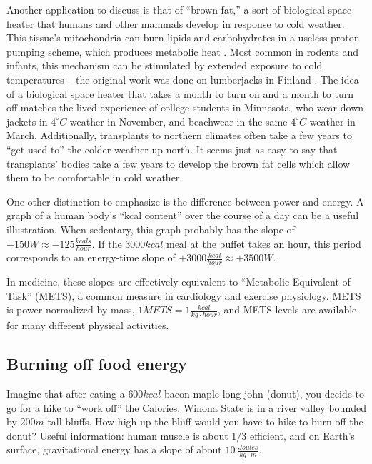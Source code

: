 \documentclass[prb,preprint]{revtex4-2}
\newcommand{\degC}{^{\circ}C}
\begin{document}
Another application to discuss is that of ``brown fat,'' a sort of biological space heater that humans and other mammals develop in response to cold weather.  This tissue's mitochondria can burn lipids and carbohydrates in a useless proton pumping scheme, which produces metabolic heat \cite{brown_fat_1,brown_fat_2,brown_fat_3,brown_fat_4}.  Most common in rodents and infants, this mechanism can be stimulated by extended exposure to cold temperatures -- the original work was done on lumberjacks in Finland \cite{finland_lumberjacks} .  The idea of a biological space heater that takes a month to turn on and a month to turn off matches the lived experience of college students in Minnesota, who wear down jackets in $4\degC$ weather in November, and beachwear in the same $4\degC$ weather in March.  Additionally, transplants to northern climates often take a few years to ``get used to'' the colder weather up north. It seems just as easy to say that transplants' bodies take a few years to develop the brown fat cells which allow them to be comfortable in cold weather.

One other distinction to emphasize is the difference between power and energy.  A graph of a human body's ``kcal content'' over the course of a day can be a useful illustration.  When sedentary, this graph probably has the slope of $-150W\approx -125 \frac{kcals}{hour}$.  If the $3000kcal$ meal at the buffet takes an hour, this period corresponds to an energy-time slope of 
$+3000\frac{kcal}{hour}\approx +3500W$.  

In medicine, these slopes are effectively equivalent to ``Metabolic Equivalent of Task'' (METS), a common measure in cardiology and exercise physiology.  METS is power normalized by mass, $1METS=1\frac{kcal}{kg\cdot hour}$, and METS levels are available for many different physical activities. \cite{METS}

\subsection{Burning off food energy}
Imagine that after eating a $600kcal$ bacon-maple long-john (donut), you decide to go for a hike to ``work off'' the Calories.  Winona State  is in a river valley bounded by $200m$ tall bluffs.  How high up the bluff would you have to hike to burn off the donut?  
Useful information: human muscle is about $1/3$ efficient, and on Earth's surface, gravitational energy has a slope of about $10~\frac{Joules}{kg\cdot m}$.
\end{document}
